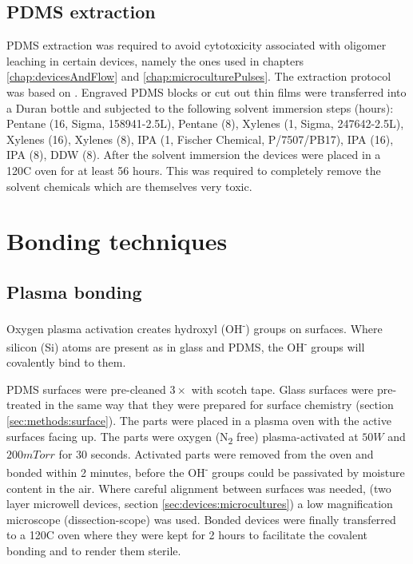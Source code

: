         \subsection{PDMS extraction}
        PDMS extraction was required to avoid cytotoxicity associated with oligomer leaching in certain devices, namely the ones used in chapters \ref{chap:devicesAndFlow} and \ref{chap:microculturePulses}. The extraction protocol was based on \cite{millet2007microfluidic}. Engraved PDMS blocks or cut out thin films were transferred into a Duran bottle and subjected to the following solvent immersion steps (hours): Pentane (16, Sigma, 158941-2.5L), Pentane (8), Xylenes (1, Sigma, 247642-2.5L), Xylenes (16), Xylenes (8), IPA (1, Fischer Chemical, P/7507/PB17), IPA (16), IPA (8), DDW (8). After the solvent immersion the devices were placed in a 120\degree C oven for at least 56 hours. This was required to completely remove the solvent chemicals which are themselves very toxic.


    \section{Bonding techniques}
    \label{sec:methods:bonding}
    \subsection{Plasma bonding}
        Oxygen plasma activation creates hydroxyl (OH\textsuperscript{-}) groups on surfaces. Where silicon (Si) atoms are present as in glass and PDMS, the OH\textsuperscript{-} groups will covalently bind to them.

        PDMS surfaces were pre-cleaned \(3\times\) with scotch tape. Glass surfaces were pre-treated in the same way that they were prepared for surface chemistry (section \ref{sec:methods:surface}). The parts were placed in a plasma oven with the active surfaces facing up. The parts were oxygen (N\textsubscript{2} free) plasma-activated at \(50W\) and \(200 mTorr\) for 30 seconds. Activated parts were removed from the oven and bonded within 2 minutes, before the OH\textsuperscript{-} groups could be passivated by moisture content in the air. Where careful alignment between surfaces was needed, (two layer microwell devices, section \ref{sec:devices:microcultures}) a low magnification microscope (dissection-scope) was used. Bonded devices were finally transferred to a 120\degree C oven where they were kept for 2 hours to facilitate the covalent bonding and to render them sterile.

